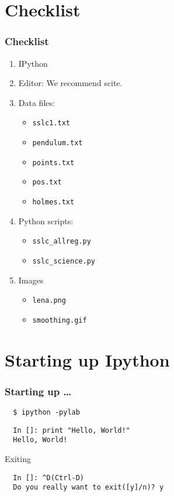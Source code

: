 \documentclass[14pt,compress]{beamer}
\newcommand{\typ}[1]{\lstinline{#1}}
\begin{document}
\section{Checklist}
\begin{frame}
\frametitle{Checklist}
  \begin{enumerate}
    \item IPython
    \item Editor: We recommend \alert{scite}.
    \item Data files: 
      \begin{itemize}
      \item \typ{sslc1.txt}
      \item \typ{pendulum.txt}
      \item \typ{points.txt}
      \item \typ{pos.txt}
      \item \typ{holmes.txt}
      \end{itemize}
    \item Python scripts: 
      \begin{itemize}
      \item \typ{sslc_allreg.py}
      \item \typ{sslc_science.py}
      \end{itemize}
    \item Images
      \begin{itemize}
      \item \typ{lena.png}
      \item \typ{smoothing.gif}
      \end{itemize}
  \end{enumerate}
\end{frame}

\section{Starting up Ipython}
\begin{frame}[fragile]
\frametitle{Starting up \ldots}
\begin{block}{}
\begin{lstlisting}
  $ ipython -pylab  
\end{lstlisting} %
\end{block}
\begin{lstlisting}     
  In []: print "Hello, World!"
  Hello, World!
\end{lstlisting}
Exiting
\begin{lstlisting}     
  In []: ^D(Ctrl-D)
  Do you really want to exit([y]/n)? y
\end{lstlisting}
\end{frame}
\end{document}

